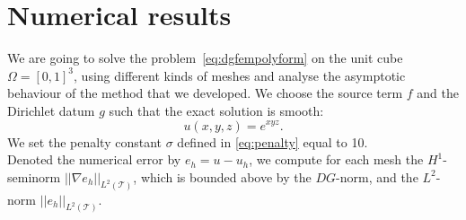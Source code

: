 \documentclass[12pt, a4paper]{article}
\theoremstyle{definition}
\theoremstyle{plain}
\theoremstyle{plain}
\begin{document}
\section{Numerical results}\label{sec:res}
We are going to solve the problem~\eqref{eq:dgfempolyform} on the unit cube $\Omega = [0,1]^3$, using different kinds of meshes and analyse the asymptotic behaviour of the method that we developed. We choose the source term $f$ and the Dirichlet datum $g$ such that the exact solution is smooth:
\begin{equation*}
	u(x,y,z) = e^{xyz}.
\end{equation*}
We set the penalty constant $\sigma$ defined in \eqref{eq:penalty} equal to 10.\\
Denoted the numerical error by $e_h= u - u_h$, we compute for each mesh the $H^1$-seminorm $|\!| \nabla e_h |\!|_{L^2(\mathcal{T})}$, which is bounded above by the $DG$-norm, and the $L^2$-norm $|\!|e_h|\!|_{L^2(\mathcal{T})}$.
\end{document}

